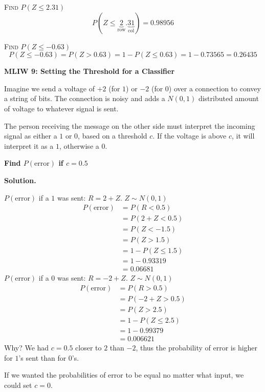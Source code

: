 \textsc{Find $ P(Z\le 2.31) $}
\[ P(Z\le \underbrace{2}_{\text{row}}.\underbrace{31}_{\text{col}})=0.98956 \]

\textsc{Find $ P(Z\le-0.63) $}
\[ P(Z\le-0.63)=P(Z>0.63)=1-P(Z\le 0.63)=1-0.73565=0.26435\]

\textbf{MLIW 9: Setting the Threshold for a Classifier}

Imagine we send a voltage of $ +2 $ (for $ 1 $) or $ -2 $ (for $ 0 $) over
a connection to convey a string of bits. The connection is noisy and adds
a $ N(0,1) $ distributed amount of voltage to whatever signal is sent.

The person receiving the message on the other side must interpret the incoming
signal as either a $ 1 $ or $ 0 $, based on a threshold $ c $. If the voltage
is above $ c $, it will interpret it as a $ 1 $, otherwise a $ 0 $.

\textbf{Find $P(\text{error})$ if $ c=0.5 $}

\textbf{Solution.}

$ P(\text{error}) $ if a $ 1 $ was sent: $ R =2+Z $. $ Z \sim N(0,1) $
\begin{align*}
    P(\text{error}) & =P(R<0.5)      \\
                    & =P(2+Z<0.5)    \\
                    & =P(Z<-1.5)     \\
                    & =P(Z> 1.5)     \\
                    & =1-P(Z\le 1.5) \\
                    & =1-0.93319     \\
                    & =0.06681
\end{align*}
$ P(\text{error}) $ if a $ 0 $ was sent: $ R=-2+Z $. $ Z \sim N(0,1) $
\begin{align*}
    P(\text{error}) & =P(R>0.5)      \\
                    & =P(-2+Z>0.5)   \\
                    & =P(Z>2.5)      \\
                    & =1-P(Z\le 2.5) \\
                    & =1-0.99379     \\
                    & =0.006621
\end{align*}
Why? We had $ c=0.5 $ closer to $ 2 $ than $ -2 $, thus the probability
of error is higher for $ 1 $'s sent than for $ 0 $'s.

If we wanted the probabilities of error to be equal no matter what input,
we could set $ c=0 $.

